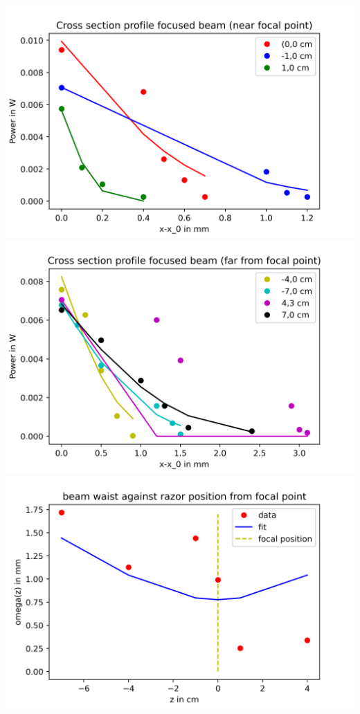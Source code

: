 \documentclass{article}
\begin{document}
\includegraphics[width=\textwidth]{Cross section profile focused beam (near focal point).png} %
\includegraphics[width=\textwidth]{Cross section profile focused beam (far from focal point).png}
\includegraphics[width=\textwidth]{beam waist against razor position from focal point.png}
\end{document}

